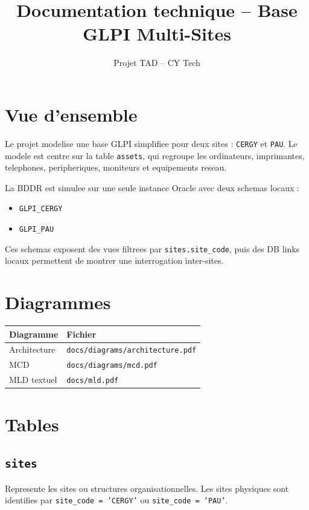 \documentclass[11pt,a4paper]{article}
\title{Documentation technique -- Base GLPI Multi-Sites}
\author{Projet TAD -- CY Tech}
\date{}
\begin{document}
\maketitle
\tableofcontents
\newpage

\section{Vue d'ensemble}

Le projet modelise une base GLPI simplifiee pour deux sites : \texttt{CERGY} et \texttt{PAU}. Le modele est centre sur la table \texttt{assets}, qui regroupe les ordinateurs, imprimantes, telephones, peripheriques, moniteurs et equipements reseau.

La BDDR est simulee sur une seule instance Oracle avec deux schemas locaux :

\begin{itemize}
  \item \texttt{GLPI\_CERGY}
  \item \texttt{GLPI\_PAU}
\end{itemize}

Ces schemas exposent des vues filtrees par \texttt{sites.site\_code}, puis des DB links locaux permettent de montrer une interrogation inter-sites.

\section{Diagrammes}

\begin{longtable}{|p{5cm}|p{8cm}|}
\hline
\textbf{Diagramme} & \textbf{Fichier} \\
\hline
Architecture & \texttt{docs/diagrams/architecture.pdf} \\
\hline
MCD & \texttt{docs/diagrams/mcd.pdf} \\
\hline
MLD textuel & \texttt{docs/mld.pdf} \\
\hline
\end{longtable}

\section{Tables}

\subsection{\texttt{sites}}

Represente les sites ou structures organisationnelles. Les sites physiques sont identifies par \texttt{site\_code = 'CERGY'} ou \texttt{site\_code = 'PAU'}.
\end{document}
